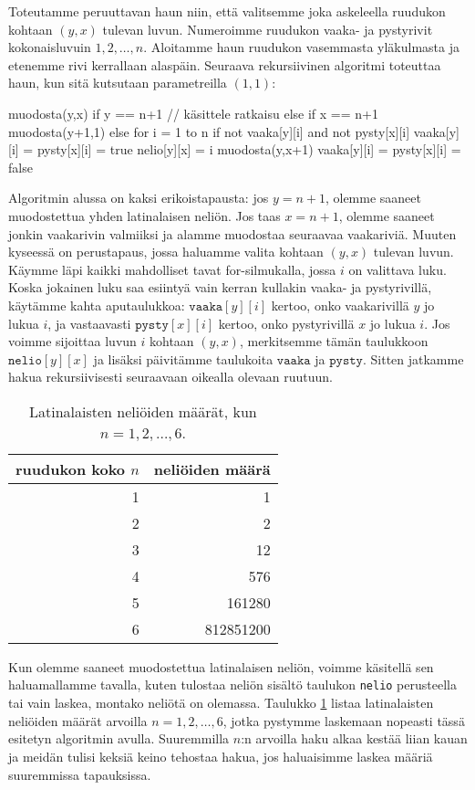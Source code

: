 Toteutamme peruuttavan haun niin, että valitsemme joka askeleella
ruudukon kohtaan $(y,x)$ tulevan luvun.
Numeroimme ruudukon vaaka- ja pystyrivit kokonaisluvuin $1,2,\dots,n$.
Aloitamme haun ruudukon vasemmasta yläkul\-masta ja etenemme
rivi kerrallaan alaspäin.
Seuraava rekursiivinen algoritmi toteuttaa haun,
kun sitä kutsutaan parametreilla $(1,1)$:

\begin{code}
muodosta(y,x)
    if y == n+1
        // käsittele ratkaisu
    else if x == n+1
        muodosta(y+1,1)
    else
        for i = 1 to n
            if not vaaka[y][i] and not pysty[x][i]
                vaaka[y][i] = pysty[x][i] = true
                nelio[y][x] = i
                muodosta(y,x+1)
                vaaka[y][i] = pysty[x][i] = false
\end{code}

Algoritmin alussa on kaksi erikoistapausta:
jos $y=n+1$, olemme saaneet muodostettua
yhden latinalaisen neliön.
Jos taas $x=n+1$, olemme saaneet jonkin vaakarivin
valmiiksi ja alamme muodostaa seuraavaa vaakariviä.
Muuten kyseessä on perustapaus, jossa haluamme
valita kohtaan $(y,x)$ tulevan luvun.
Käymme läpi kaikki mahdolliset tavat for-silmukalla,
jossa $i$ on valittava luku.
Koska jokainen luku saa esiintyä vain kerran kullakin
vaaka- ja pystyrivillä, käytämme kahta aputaulukkoa:
$\texttt{vaaka}[y][i]$ kertoo, onko vaakarivillä $y$
jo lukua $i$, ja vastaavasti $\texttt{pysty}[x][i]$ kertoo,
onko pystyrivillä $x$ jo lukua $i$.
Jos voimme sijoittaa luvun $i$ kohtaan $(y,x)$,
merkitsemme tämän taulukkoon $\texttt{nelio}[y][x]$
ja lisäksi päivitämme taulukoita $\texttt{vaaka}$ ja $\texttt{pysty}$.
Sitten jatkamme hakua rekursiivisesti seuraavaan
oikealla olevaan ruutuun.

\begin{table}
\center
\begin{tabular}{rr}
ruudukon koko $n$ & neliöiden määrä \\
\hline
1 & 1 \\
2 & 2 \\
3 & 12 \\
4 & 576 \\
5 & 161280 \\
6 & 812851200 \\
\end{tabular}
\caption{Latinalaisten neliöiden määrät, kun $n=1,2,\dots,6$.}
\label{tab:latnel}
\end{table}

Kun olemme saaneet muodostettua latinalaisen neliön, voimme käsitellä
sen haluamallamme tavalla, kuten tulostaa neliön sisältö
taulukon \texttt{nelio} perusteella
tai vain laskea, montako neliötä on olemassa.
Taulukko \ref{tab:latnel} listaa latinalaisten neliöiden
määrät arvoilla $n=1,2,\dots,6$, jotka pystymme laskemaan
nopeasti tässä esitetyn algoritmin avulla.
Suuremmilla $n$:n arvoilla haku alkaa kestää liian kauan
ja meidän tulisi keksiä keino tehostaa hakua,
jos haluaisimme laskea määriä suuremmissa tapauksissa.

